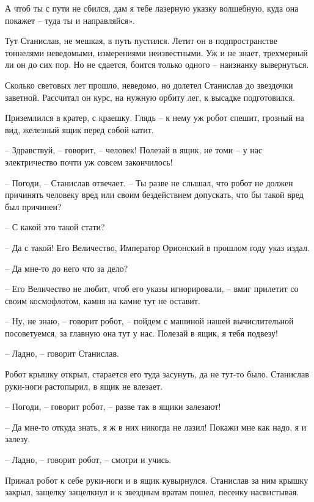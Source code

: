 \documentclass[ebook,oneside,final,openright]{memoir}
\begin{document}
А чтоб ты с пути не сбился, дам я тебе лазерную указку волшебную, куда она покажет – туда ты и направляйся».\par
\par
Тут Станислав, не мешкая, в путь пустился. Летит он в подпространстве тоннелями неведомыми, измерениями неизвестными. Уж и не знает, трехмерный ли он до сих пор. Но не сдается, боится только одного – наизнанку вывернуться.\par
\par
Сколько световых лет прошло, неведомо, но долетел Станислав до звездочки заветной. Рассчитал он курс, на нужную орбиту лег, к высадке подготовился.\par
\par
Приземлился в кратер, с краешку. Глядь – к нему уж робот спешит, грозный на вид, железный ящик перед собой катит.\par
– Здравствуй, – говорит, – человек! Полезай в ящик, не томи – у нас электричество почти уж совсем закончилось!\par
– Погоди, – Станислав отвечает. – Ты разве не слышал, что робот не должен причинять человеку вред или своим бездействием допускать, что бы такой вред был причинен?\par
– С какой это такой стати?\par
– Да с такой! Его Величество, Император Орионский в прошлом году указ издал.\par
– Да мне-то до него что за дело?\par
– Его Величество не любит, чтоб его указы игнорировали, – вмиг прилетит со своим космофлотом, камня на камне тут не оставит.\par
– Ну, не знаю, – говорит робот, – пойдем с машиной нашей вычислительной посоветуемся, за главную она тут у нас. Полезай в ящик, я тебя подвезу!\par
– Ладно, – говорит Станислав.\par
Робот крышку открыл, старается его туда засунуть, да не тут-то было. Станислав руки-ноги растопырил, в ящик не влезает. \par
– Погоди, – говорит робот, – разве так в ящики залезают! \par
– Да мне-то откуда знать, я ж в них никогда не лазил! Покажи мне как надо, я и залезу. \par
– Ладно, – говорит робот, – смотри и учись. \par
Прижал робот к себе руки-ноги и в ящик кувырнулся. Станислав за ним крышку закрыл, защелку защелкнул и к звездным вратам пошел, песенку насвистывая.\par
\end{document}
